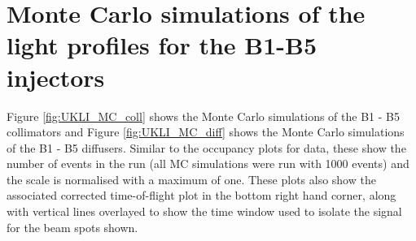 \begin{figure}[!htbp]
        
    \end{figure}
    


\section{Monte Carlo simulations of the light profiles for the B1-B5 injectors}
    

Figure \ref{fig:UKLI_MC_coll} shows the Monte Carlo simulations of the B1 - B5 collimators and Figure \ref{fig:UKLI_MC_diff} shows the Monte Carlo simulations of the B1 - B5 diffusers. Similar to the occupancy plots for data, these show the number of events in the run (all MC simulations were run with 1000 events) and the scale is normalised with a maximum of one. These plots also show the associated corrected time-of-flight plot in the bottom right hand corner, along with vertical lines overlayed to show the time window used to isolate the signal for the beam spots shown. 

